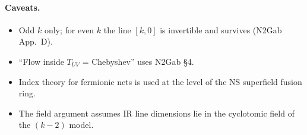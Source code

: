 \documentclass[11pt]{article}
\begin{document}
\paragraph{Caveats.}
\begin{itemize}
\item Odd $k$ only; for even $k$ the line $[k,0]$ is invertible and survives (N2Gab App.~D).
\item ``Flow inside $T_{UV}$ = Chebyshev'' uses N2Gab \S4.
\item Index theory for fermionic nets is used at the level of the NS superfield fusion ring.
\item The field argument assumes IR line dimensions lie in the cyclotomic field of the $(k-2)$ model.
\end{itemize}
\end{document}
